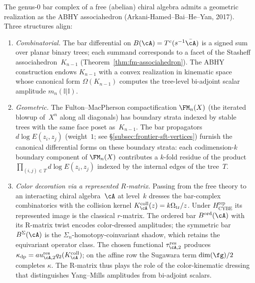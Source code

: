 \begin{remark}
\label{rem:frontier-positive-geometry-bar}
\ClaimStatusConjectured
{}
The genus-$0$ bar complex of a free (abelian) chiral algebra
admits a geometric realization as the ABHY associahedron
(Arkani-Hamed--Bai--He--Yan, 2017).
Three structures align:
\begin{enumerate}[label=\textup{(\roman*)}]
\item \emph{Combinatorial.}
 The bar differential on
 $B(\cA) = T^c(s^{-1}\bar\cA)$
 is a signed sum over planar binary trees; each summand
 corresponds to a facet of the Stasheff
 associahedron~$K_{n-1}$
 (Theorem~\ref{thm:fm-associahedron}).
 The ABHY construction endows $K_{n-1}$ with a convex
 realization in kinematic space whose canonical form
 $\Omega(K_{n-1})$ computes the tree-level bi-adjoint
 scalar amplitude $m_n(\mathbb{I} | \mathbb{I})$.

\item \emph{Geometric.}
 The Fulton--MacPherson compactification
 $\FM_n(X)$ (the iterated blowup of~$X^n$ along all
 diagonals) has boundary strata indexed by stable
 trees with the same face poset as~$K_{n-1}$.
 The bar propagators $d\log E(z_i, z_j)$
 (weight~$1$; see \S\ref{subsec:frontier-sft-vertices})
 furnish the canonical differential forms on these
 boundary strata: each codimension-$k$ boundary
 component of $\FM_n(X)$ contributes a $k$-fold
 residue of the product $\prod_{(i,j) \in T} d\log E(z_i, z_j)$
 indexed by the internal edges of the tree~$T$.

\item \emph{Color decoration via a represented $R$-matrix.}
 Passing from the free theory to an interacting
 chiral algebra~$\cA$ at level~$k$ dresses the
 bar-complex combinatorics with the collision kernel
 $K_\cA^{\mathrm{coll}}(z)=k\Omega_{\mathrm{tr}}/z$.
 Under $H_{\mathrm{CYBE}}^{\mathrm{rep}}$ its represented image is
 the classical $r$-matrix.
 The ordered bar $B^{\mathrm{ord}}(\cA)$ with its
 R-matrix twist encodes color-dressed amplitudes;
 the symmetric bar $B^{\Sigma}(\cA)$
 is the $\Sigma_n$-homotopy-coinvariant shadow, which retains the
 equivariant operator class.  The chosen functional
 $\tau_{\cA,2}^{\mathrm{res}}$ produces
 $\kappa_{\mathrm{dp}}=	au_{\cA,2}^{\mathrm{res}}
 q_2(K_\cA^{\mathrm{coll}})$; on the affine row the Sugawara term
 $\dim(\fg)/2$ completes $\kappa$.
 The R-matrix thus plays the role of the
 color-kinematic dressing that distinguishes
 Yang--Mills amplitudes from bi-adjoint scalars.
\end{enumerate}


\end{remark}
